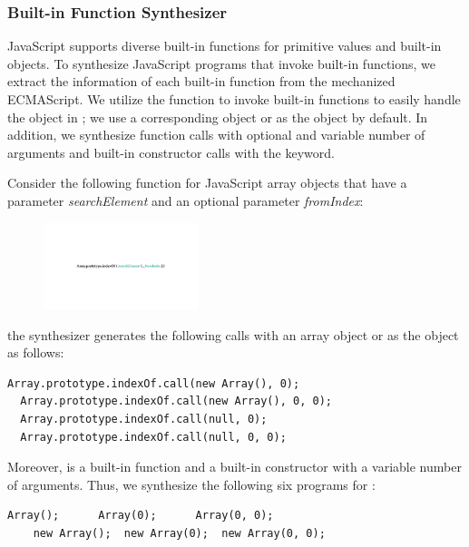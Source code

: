 \subsubsection{Built-in Function Synthesizer}

JavaScript supports diverse built-in functions for primitive values and built-in objects.
To synthesize JavaScript programs that invoke built-in functions,
we extract the information of each built-in function from the mechanized ECMAScript.
We utilize the  function to invoke
built-in functions to easily handle the  object in ;
we use a corresponding object or  as the  object by default.
In addition, we synthesize function calls with optional and variable number of arguments
and built-in constructor calls with the  keyword.

Consider the following  function for
JavaScript array objects that have a parameter \textit{searchElement}
and an optional parameter \textit{fromIndex}:

\vspace*{-.5em}
\begin{figure}[H]
  \centering
  \includegraphics[width=0.4\textwidth]{img/array-indexof.pdf}
\end{figure}
\vspace*{-.5em}

\noindent
the synthesizer generates the following calls with an array object or  as the 
object as follows:
\begin{lstlisting}[style=myJSstyle]
  Array.prototype.indexOf.call(new Array(), 0);
  Array.prototype.indexOf.call(new Array(), 0, 0);
  Array.prototype.indexOf.call(null, 0);
  Array.prototype.indexOf.call(null, 0, 0);
\end{lstlisting}
Moreover,  is a built-in function and
a built-in constructor with a variable number of arguments.
Thus, we synthesize the following six programs for :
\begin{lstlisting}[style=myJSstyle]
    Array();      Array(0);      Array(0, 0);
    new Array();  new Array(0);  new Array(0, 0);
\end{lstlisting}
